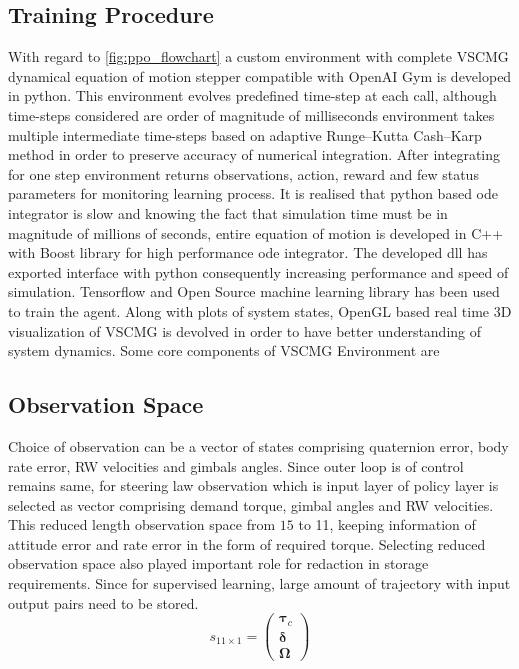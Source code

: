 \subsection{Training Procedure}
With regard to \autoref{fig:ppo_flowchart} a custom environment with complete VSCMG dynamical equation of motion stepper compatible with OpenAI Gym \cite{OpenAIGym} is developed in python. This environment evolves predefined time-step at each call, although time-steps considered are order of magnitude of milliseconds environment takes multiple intermediate time-steps based on adaptive  Runge–Kutta Cash–Karp method in order to preserve accuracy of numerical integration. After integrating for one step environment returns observations, action, reward and few status parameters for monitoring learning process. It is realised that python based  \acrfull{ode} integrator is slow and knowing the fact that simulation time must be in magnitude of millions of seconds, entire equation of motion is developed in C++ with Boost library \cite{abrahams2003building} for high performance \acrshort{ode} integrator. The developed \acrfull{dll} has exported interface with python consequently increasing performance and speed of simulation. Tensorflow and Open Source machine learning library has been used to train the agent. Along with plots of system states, OpenGL based real time 3D visualization of VSCMG is devolved in order to have better understanding of system dynamics. Some core components of VSCMG Environment are 
\subsection{Observation Space}
Choice of observation can be a vector of states comprising quaternion error, body rate error, RW velocities and gimbals angles. Since outer loop is of control remains same, for steering law observation which is input layer of policy layer is selected as vector comprising demand torque, gimbal angles and RW velocities. This reduced length observation space from $\displaystyle 15$ to 11, keeping information of attitude error and rate error in the form of required torque. Selecting reduced observation space also played important role for redaction in storage requirements. Since for supervised learning, large amount of trajectory with input output pairs need to be stored.
\begin{equation}
s_{11\times 1} =\begin{pmatrix}
\mathbf{\tau }_{c}\\
\mathbf{{\delta }}\\
\mathbf{{\Omega }}
\end{pmatrix}
\end{equation}

